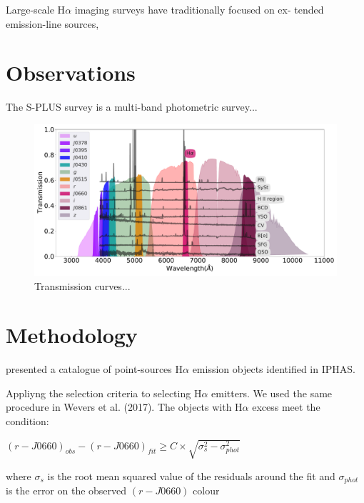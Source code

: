 \documentclass[fleqn,usenatbib]{mnras}
\begin{document}
Large-scale H{$\alpha$} imaging surveys have traditionally focused on ex-
tended emission-line sources,



\section{Observations}
\label{sec:obser}

The S-PLUS survey is a multi-band photometric survey...

\begin{figure}
	\includegraphics[width=0.9\linewidth]{Figs/splus-filter.pdf}
    \caption{Transmission curves...}
    \label{fig:curves}
\end{figure}


\section{Methodology}
\label{sec:meth}

\citet{Witham:2008} presented a catalogue of point-sources H{$\alpha$} emission objects identified in IPHAS. 

Appliyng the selection criteria to selecting H$\alpha$ emitters. We used the same procedure in Wevers et al. (2017). The objects with H$\alpha$ excess meet the condition:

 $(r - J0660)_{obs} - (r - J0660)_{fit} \geq C \times \sqrt{\sigma^2_s - \sigma^2_{phot}}$ 
 
where $\sigma_s$ is the root mean squared value of the residuals around
the fit and $\sigma_{phot}$ is the error on the observed $(r - J0660)$ colour
\end{document}
